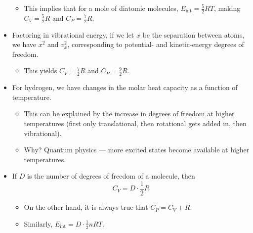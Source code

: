 \documentclass[../notes.tex]{subfiles}
\begin{document}
\begin{itemize}
    \begin{itemize}
        \item This implies that for a mole of diatomic molecules, $E_\text{int}=\frac{5}{2}RT$, making $C_V=\frac{5}{2}R$ and $C_P=\frac{7}{2}R$.
    \end{itemize}
    \item Factoring in vibrational energy, if we let $x$ be the separation between atoms, we have $x^2$ and $v_x^2$, corresponding to potential- and kinetic-energy degrees of freedom.
    \begin{itemize}
        \item This yields $C_V=\frac{7}{2}R$ and $C_P=\frac{9}{2}R$.
    \end{itemize}
    \item For hydrogen, we have changes in the molar heat capacity as a function of temperature.
    \begin{itemize}
        \item This can be explained by the increase in degrees of freedom at higher temperatures (first only translational, then rotational gets added in, then vibrational).
        \item Why? Quantum physics --- more excited states become available at higher temperatures.
    \end{itemize}
    \item If $D$ is the number of degrees of freedom of a molecule, then
    \begin{equation*}
        C_V = D\cdot\frac{1}{2}R
    \end{equation*}
    \begin{itemize}
        \item On the other hand, it is always true that $C_P=C_V+R$.
        \item Similarly, $E_\text{int}=D\cdot\frac{1}{2}nRT$.
    \end{itemize}
\end{itemize}
\end{document}
